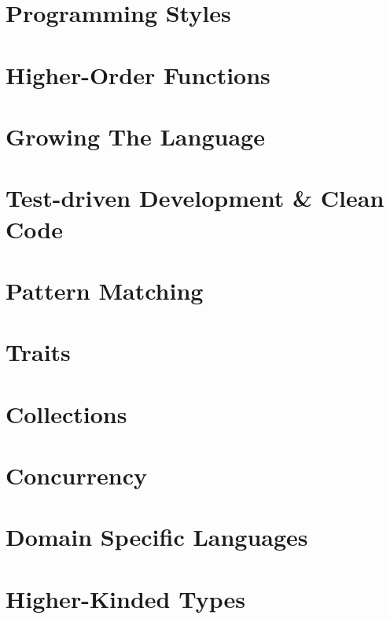\part[Programming Styles]{Programming Styles}
\part[Higher-Order Functions]{Higher-Order Functions}
\part[Growing The Language]{Growing The Language}
\part[TDD \& Clean Code]{Test-driven Development \& Clean Code}
\part[Pattern Matching]{Pattern Matching}
\part[Traits]{Traits}
\part[Collections]{Collections}
\part[Concurrency]{Concurrency}
\part[DSLs]{Domain Specific Languages}
\part[Higher-Kinded Types]{Higher-Kinded Types}